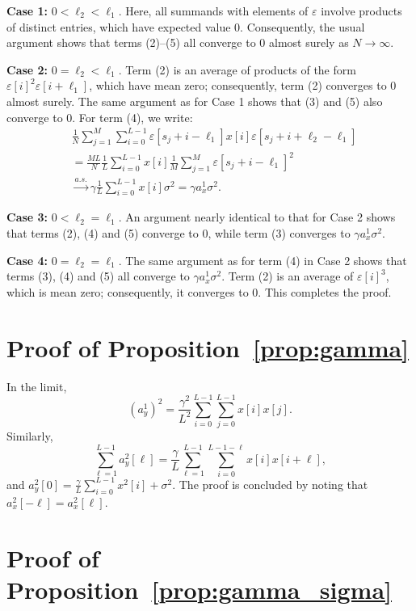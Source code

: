 \documentclass[12pt]{article}
\newcommand{\ep}{\varepsilon}
\newcommand{\1}{\mathbf{1}}
\theoremstyle{plain}
\theoremstyle{definition}
\theoremstyle{remark}
\theoremstyle{plain}
\theoremstyle{remark}
\theoremstyle{plain}
\theoremstyle{plain}
\theoremstyle{plain}
\numberwithin{equation}{section}
\begin{document}
{\bf Case 1:} $0 < \ell_2 < \ell_1$. Here, all summands with elements of $\ep$ involve products of distinct entries, which have expected value 0. Consequently, the usual argument shows that terms (2)--(5) all converge to 0 almost surely as $N \to \infty$.

{\bf Case 2:} $0=\ell_2 < \ell_1$. Term (2) is an average of products of the form $\ep[i]^2\ep[i+\ell_1]$, which have mean zero; consequently, term (2) converges to 0 almost surely. The same argument as for Case 1 shows that (3) and (5) also converge to 0. For term (4), we write:
%
\begin{align*}
%
&\frac{1}{N}\sum_{j=1}^{M} 
\sum_{i=0}^{L-1} \ep[s_j+i-\ell_1]x[i]\ep[s_j+ i+\ell_2-\ell_1]
\nonumber \\
&= \frac{ML}{N}\frac{1}{L}\sum_{i=0}^{L-1}x[i] \frac{1}{M}\sum_{j=1}^{M} \ep[s_j+i-\ell_1]^2
\\& \xrightarrow{a.s.} \gamma \frac{1}{L} \sum_{i=0}^{L-1}x[i] \sigma^2 = \gamma a_x^1 \sigma^2. \nonumber
%
\end{align*}

{\bf Case 3:} $0<\ell_2 = \ell_1$. An argument nearly identical to that for Case 2 shows that terms (2), (4) and (5) converge to 0, while term (3) converges to $\gamma a_x^1 \sigma^2$.

{\bf Case 4:} $0=\ell_2 = \ell_1$. The same argument as for term (4) in Case 2 shows that terms (3), (4) and (5) all converge to $\gamma a_x^1 \sigma^2$. Term (2) is an average of $\ep[i]^3$, which is mean zero; consequently, it converges to 0.
This completes the proof.


\section{Proof of Proposition~\ref{prop:gamma}} \label{sec:proof_prop_gamma}

In the limit, 
\begin{equation*}
(a^1_y)^2=\frac{\gamma^2}{L^2}\sum_{i=0}^{L-1}\sum_{j=0}^{L-1}x[i]x[j].
\end{equation*}
Similarly,  
\begin{equation*}
\sum_{\ell = 1}^{L-1}a_y^2[\ell]=\frac{\gamma}{L}\sum_{\ell = 1}^{L-1}\sum_{i=0}^{L-1-\ell}x[i]x[i+\ell],
\end{equation*}
and $a_y^2[0]=\frac{\gamma}{L}\sum_{i=0}^{L-1}x^2[i] + \sigma^2$. The proof is concluded by noting that  $a_x^2[-\ell]=a_x^2[\ell]$. 


\section{Proof of Proposition~\ref{prop:gamma_sigma}} \label{sec:proof_prop_gamma_sigma}
\end{document}
